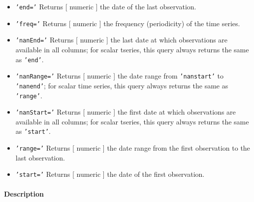 \begin{itemize}
\item
  \texttt{'end='} Returns {[} numeric {]} the date of the last
  observation.
\item
  \texttt{'freq='} Returns {[} numeric {]} the frequency (periodicity)
  of the time series.
\item
  \texttt{'nanEnd='} Returns {[} numeric {]} the last date at which
  observations are available in all columns; for scalar tseries, this
  query always returns the same as \texttt{'end'}.
\item
  \texttt{'nanRange='} Returns {[} numeric {]} the date range from
  \texttt{'nanstart'} to \texttt{'nanend'}; for scalar time series, this
  query always returns the same as \texttt{'range'}.
\item
  \texttt{'nanStart='} Returns {[} numeric {]} the first date at which
  observations are available in all columns; for scalar tseries, this
  query always returns the same as \texttt{'start'}.
\item
  \texttt{'range='} Returns {[} numeric {]} the date range from the
  first observation to the last observation.
\item
  \texttt{'start='} Returns {[} numeric {]} the date of the first
  observation.
\end{itemize}

\paragraph{Description}\label{description}


